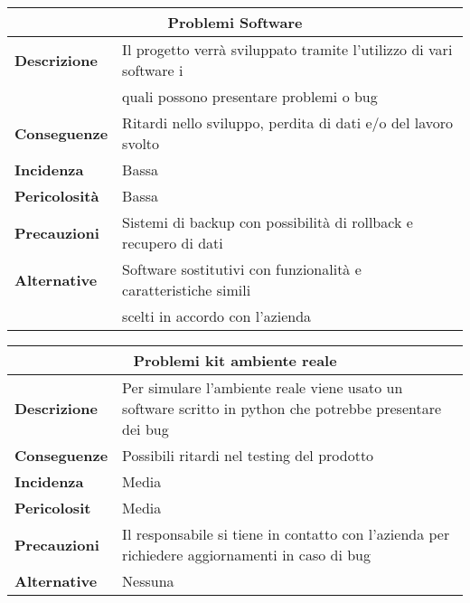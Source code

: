\begin{center}
    \begin{tabularx}{0.8\linewidth}{l|l}
        \multicolumn{2}{c}{\textbf{Problemi Software}}                                                          \\
        \hline{\textbf{Descrizione}}    & Il progetto verrà sviluppato tramite l'utilizzo di vari software i     \\ 
                                        & quali possono presentare problemi o bug                               \\
        \textbf{Conseguenze}            & Ritardi nello sviluppo, perdita di dati e/o del lavoro svolto         \\
        \textbf{Incidenza}              & Bassa                                                                 \\
        \textbf{Pericolosità}           & Bassa                                                                 \\
        \textbf{Precauzioni}            & Sistemi di backup con possibilità di rollback e recupero di dati      \\
        \textbf{Alternative}            & Software sostitutivi con funzionalità e caratteristiche simili        \\ 
                                        & scelti in accordo con l'azienda                                       \\     
    \end{tabularx}
\end{center}

\begin{center}
    \begin{tabularx}{0.8\linewidth}{l|X}
        \multicolumn{2}{c}{\textbf{Problemi kit ambiente reale}}                                                \\
        \hline{\textbf{Descrizione}}    & Per simulare l'ambiente reale viene usato un software scritto in python che potrebbe presentare dei bug\\
        \textbf{Conseguenze}& Possibili ritardi nel testing del prodotto\\
        \textbf{Incidenza} &Media\\
        \textbf{Pericolosit}&Media\\
        \textbf{Precauzioni} & Il responsabile si tiene in contatto con l'azienda per richiedere aggiornamenti in caso di bug\\
        \textbf{Alternative}& Nessuna\\      
    \end{tabularx}
\end{center}

